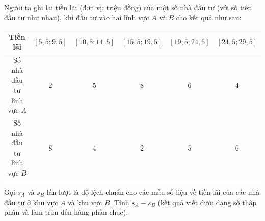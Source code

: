 \begin{ex}%
	Người ta ghi lại tiền lãi (đơn vị: triệu đồng) của một số nhà đầu tư (với số tiền đầu tư như nhau), khi đầu tư vào hai lĩnh vực $A$ và $B$ cho kết quả như sau:
	\begin{center}
		\begin{tabular}{|c|c|c|c|c|c|}
			\hline
			Tiền lãi&$[5{,}5;9{,}5]$&$[10{,}5;14{,}5]$&$[15{,}5;19{,}5]$&$[19{,}5;24{,}5]$&$[24{,}5;29{,}5]$\\
			\hline
			Số nhà đầu tư lĩnh vực $A$&$2$&$5$&$8$&$6$&$4$\\
			\hline
			Số nhà đầu tư lĩnh vực $B$&$8$&$4$&$2$&$5$&$6$\\
			\hline
		\end{tabular}
	\end{center}
	Gọi $s_A$ và $s_B$ lần lượt là độ lệch chuẩn cho các mẫu số liệu về tiền lãi của các nhà đầu tư ở khu vực $A$ và khu vực $B$. Tính $s_A-s_B$ (kết quả viết dưới dạng số thập phân và làm tròn đến hàng phần chục).
	

\end{ex}
